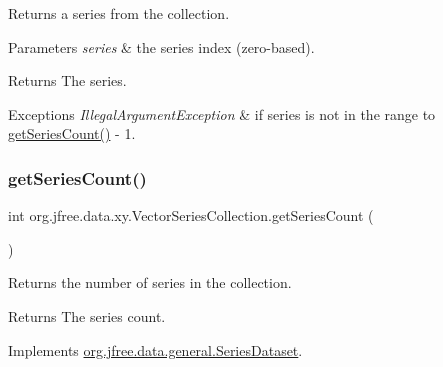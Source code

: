 Returns a series from the collection.


\begin{DoxyParams}{Parameters}
{\em series} & the series index (zero-\/based).\\
\hline
\end{DoxyParams}
\begin{DoxyReturn}{Returns}
The series.
\end{DoxyReturn}

\begin{DoxyExceptions}{Exceptions}
{\em Illegal\+Argument\+Exception} & if {\ttfamily series} is not in the range {} to {\ttfamily \mbox{\hyperlink{classorg_1_1jfree_1_1data_1_1xy_1_1_vector_series_collection_ad7e902eb4447d1f31fb900fab80157b8}{get\+Series\+Count()}} -\/ 1}. \\
\hline
\end{DoxyExceptions}
\mbox{\label{classorg_1_1jfree_1_1data_1_1xy_1_1_vector_series_collection_ad7e902eb4447d1f31fb900fab80157b8}} 
\subsubsection{\texorpdfstring{get\+Series\+Count()}{getSeriesCount()}}
{\footnotesize\ttfamily int org.\+jfree.\+data.\+xy.\+Vector\+Series\+Collection.\+get\+Series\+Count (\begin{DoxyParamCaption}{ }\end{DoxyParamCaption})}

Returns the number of series in the collection.

\begin{DoxyReturn}{Returns}
The series count. 
\end{DoxyReturn}


Implements \mbox{\hyperlink{interfaceorg_1_1jfree_1_1data_1_1general_1_1_series_dataset_a84fe822f5918f941d9de1ed1b73c9f58}{org.\+jfree.\+data.\+general.\+Series\+Dataset}}.

\mbox{\label{classorg_1_1jfree_1_1data_1_1xy_1_1_vector_series_collection_a228ffe9cdfe7b8b0736b9e65bccc0057}} 
